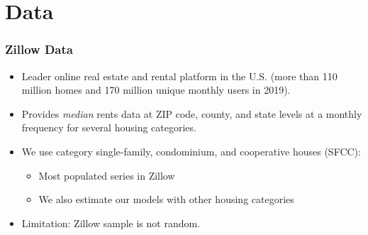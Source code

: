 \documentclass[aspectratio=169, t]{beamer}
\begin{document}
\section{Data}

\begin{frame}[label = zillow_data]
    \frametitle{Zillow Data}
    
    \begin{itemize}
        \item Leader online real estate and rental platform in the U.S. {\small (more 
        than 110 million homes and 170 million unique monthly users in 2019).}
        
        \vspace{2mm} \item
        Provides \textit{median} rents data at ZIP code, county, and state levels 
        at a monthly frequency for several housing categories.
        
        \pause
        \vspace{2mm} \item
        We use category single-family, condominium, and cooperative houses (SFCC):
        \begin{itemize}
            \item Most populated series in Zillow
            \item We also estimate our models with other housing categories
        \end{itemize}
        
        \vspace{2mm} \item
        Limitation: Zillow sample is not random.        
        \hyperlink{zillow_pop_density}{}

    \end{itemize}
\end{frame}
\end{document}
